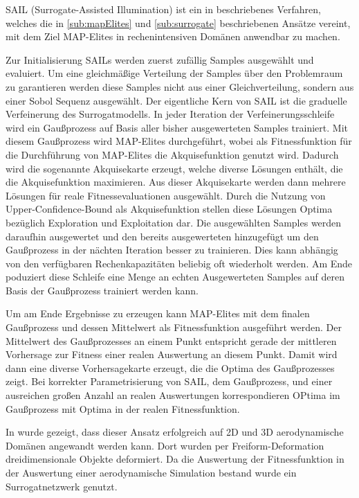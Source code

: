 
SAIL (Surrogate-Assisted Illumination) ist ein in \cite{Gaier.6152018} beschriebenes Verfahren, welches die in \ref{sub:mapElites} und \ref{sub:surrogate} beschriebenen Ansätze vereint, mit dem Ziel MAP-Elites in rechenintensiven Domänen anwendbar zu machen.

Zur Initialisierung SAILs werden zuerst zufällig Samples ausgewählt und evaluiert.
Um eine gleichmäßige Verteilung der Samples über den Problemraum zu garantieren werden diese Samples nicht aus einer Gleichverteilung, sondern aus einer Sobol Sequenz ausgewählt.
Der eigentliche Kern von SAIL ist die graduelle Verfeinerung des Surrogatmodells.
In jeder Iteration der Verfeinerungsschleife wird ein Gaußprozess auf Basis aller bisher ausgewerteten Samples trainiert.
Mit diesem Gaußprozess wird MAP-Elites durchgeführt, wobei als Fitnessfunktion für die Durchführung von MAP-Elites die Akquisefunktion genutzt wird.
Dadurch wird die sogenannte Akquisekarte erzeugt, welche diverse Lösungen enthält, die die Akquisefunktion maximieren.
Aus dieser Akquisekarte werden dann mehrere Lösungen für reale Fitnessevaluationen ausgewählt.
Durch die Nutzung von Upper-Confidence-Bound als Akquisefunktion stellen diese Lösungen Optima bezüglich Exploration und Exploitation dar.
Die ausgewählten Samples werden daraufhin ausgewertet  und den bereits ausgewerteten hinzugefügt um den Gaußprozess in der nächten Iteration besser zu trainieren.
Dies kann abhängig von den verfügbaren Rechenkapazitäten beliebig oft wiederholt werden.
Am Ende poduziert diese Schleife eine Menge an echten Ausgewerteten Samples auf deren Basis der Gaußprozess trainiert werden kann.

Um am Ende Ergebnisse zu erzeugen kann MAP-Elites mit dem finalen Gaußprozess und dessen Mittelwert als Fitnessfunktion ausgeführt werden.
Der Mittelwert des Gaußprozesses an einem Punkt entspricht gerade der mittleren Vorhersage zur Fitness einer realen Auswertung an diesem Punkt.
Damit wird dann eine diverse Vorhersagekarte erzeugt, die die Optima des Gaußprozesses zeigt.
Bei korrekter Parametrisierung von SAIL, dem Gaußprozess, und einer ausreichen großen Anzahl an realen Auswertungen korrespondieren OPtima im Gaußprozess mit Optima in der realen Fitnessfunktion.

In \cite{Gaier.6152018} wurde gezeigt, dass dieser Ansatz erfolgreich auf 2D und 3D aerodynamische Domänen angewandt werden kann.
Dort wurden per Freiform-Deformation dreidimensionale Objekte deformiert.
Da die Auswertung der Fitnessfunktion in der Auswertung einer aerodynamische Simulation bestand wurde ein Surrogatnetzwerk genutzt.


